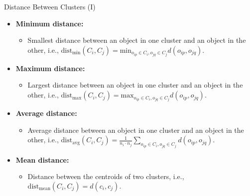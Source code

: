 \begin{frame}{Distance Between Clusters (I)}
	\begin{itemize}
		\item \textbf{Minimum distance:}
		      \begin{itemize}
			      \item Smallest distance between an object in one cluster and an
			            object in the other, i.e., $\text{dist}_{\text{min}} (C_i, C_j) =
				            \text{min}_{o_{ip} \in C_i, o_{jq} \in C_j} d(o_{ip}, o_{jq})$.
		      \end{itemize}
		\item \textbf{Maximum distance:}
		      \begin{itemize}
			      \item Largest distance between an object in one cluster and an
			            object in the other, i.e., $\text{dist}_\text{max}(C_i, C_j) =
				            \text{max}_{o_{ip} \in C_i, o_{jq} \in C_j} d(o_{ip}, o_{jq}).$
		      \end{itemize}
		\item \textbf{Average distance:}
		      \begin{itemize}
			      \item Average distance between an object in one cluster and an
			            object in the other, i.e., $\text{dist}_{\text{avg}} (C_i, C_j) =
				            \frac{1}{n_i \cdot n_j} \sum_{o_{ip} \in C_i, o_{jq} \in C_j}
				            d(o_{ip}, o_{jq}).$
		      \end{itemize}
		\item \textbf{Mean distance:}
		      \begin{itemize}
			      \item Distance between the centroids of two clusters, i.e.,
			            $\text{dist}_{\text{mean}} (C_i, C_j) = d(c_i, c_j).$
		      \end{itemize}
	\end{itemize}
\end{frame}

